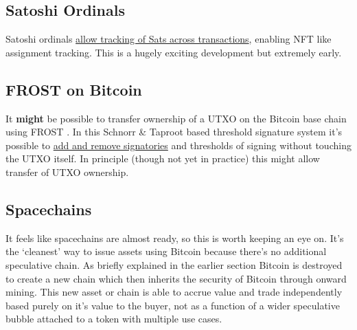 \subsection{Satoshi Ordinals}
Satoshi ordinals \href{https://github.com/casey/ord}{allow tracking of Sats across transactions}, enabling NFT like assignment tracking. This is a hugely exciting development but extremely early.
\subsection{FROST on Bitcoin}
It \textbf{might} be possible to transfer ownership of a UTXO on the Bitcoin base chain using FROST \cite{komlo2020frost}. In this Schnorr \& Taproot based threshold signature system it's possible to \href{https://btctranscripts.com/sydney-bitcoin-meetup/2022-03-29-socratic-seminar/}{add and remove signatories} and thresholds of signing without touching the UTXO itself. In principle (though not yet in practice) this might allow transfer of UTXO ownership. 
\subsection{Spacechains}
It feels like spacechains are almost ready, so this is worth keeping an eye on. It's the `cleanest' way to issue assets using Bitcoin because there's no additional speculative chain. As briefly explained in the earlier section Bitcoin is destroyed to create a new chain which then inherits the security of Bitcoin through onward mining. This new asset or chain is able to accrue value and trade independently based purely on it's value to the buyer, not as a function of a wider speculative bubble attached to a token with multiple use cases.
